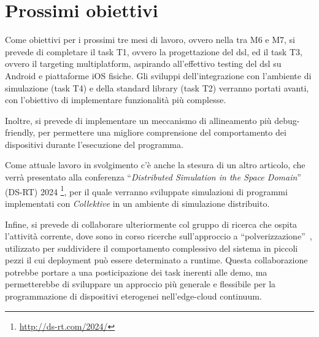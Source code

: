 \documentclass[13pt, a4paper]{article}
\newcommand{\ck}{\emph{Collektive}}
\begin{document}
\section{Prossimi obiettivi}\label{sec:prossimi-obiettivi}


Come obiettivi per i prossimi tre mesi di lavoro, ovvero nella  tra M6 e M7,
    si prevede di completare il task T1, ovvero la progettazione del \ac{dsl},
    ed il task T3, ovvero il targeting multiplatform,
    aspirando all'effettivo testing del \ac{dsl} su Android e piattaforme iOS fisiche.
%
Gli sviluppi dell'integrazione con l'ambiente di simulazione (task T4) e della standard library (task T2) verranno portati
    avanti, con l'obiettivo di implementare funzionalità più complesse.

Inoltre, si prevede di implementare un meccanismo di allineamento più debug-friendly,
    per permettere una migliore comprensione del comportamento dei dispositivi durante l'esecuzione del programma.

Come attuale lavoro in svolgimento c'è anche la stesura di un altro articolo, che verrà presentato alla conferenza
    ``\emph{Distributed Simulation in the Space Domain}'' (DS-RT) 2024
    \footnote{\url{http://ds-rt.com/2024/}},
    per il quale verranno sviluppate simulazioni di programmi implementati con \ck{} in un ambiente di simulazione distribuito.

Infine, si prevede di collaborare ulteriormente col gruppo di ricerca che ospita l'attività corrente,
dove sono in corso
    ricerche sull'approccio a ``polverizzazione''~\cite{fi12110203},
    utilizzato per suddividere il comportamento complessivo del sistema
in piccoli pezzi il cui deployment può essere determinato a runtime.
%
Questa collaborazione potrebbe portare a una posticipazione dei task inerenti alle demo, ma permetterebbe di sviluppare
    un approccio più generale e flessibile per la programmazione di dispositivi eterogenei nell'edge-cloud continuum.





\end{document}
